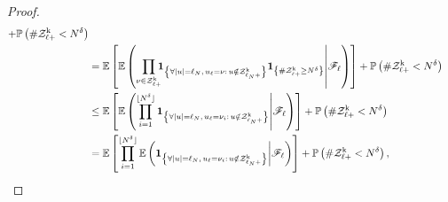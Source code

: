 \begin{proof}
\begin{align*}
        +
        \mathbb P\left(
            \#\mathcal Z^{\mathrm{k}}_{\ell+}
            <
            N^\delta
        \right)
        \\ &
        =
        \mathbb E\left[
            \mathbb E\left(
                \prod_{
                    \nu\in
                    \mathcal Z^{\mathrm{k}}_{\ell+}
                }
                \!\!\!
                {\bf 1}_{
                    \left\{
                        \forall|u|=\ell_N,\,
                        u_\ell=\nu:\,
                        u\notin
                        \mathcal Z^{\mathrm{k}}_{\ell_N+}
                    \right\}
                }
                {\bf 1}_{
                    \left\{
                        \#\mathcal Z^{\mathrm{k}}_{\ell+}
                        \ge
                        N^\delta
                    \right\}
                }
                \middle|
                \mathscr F_\ell
            \right)
        \right]
        +
        \mathbb P\left(
            \#\mathcal Z^{\mathrm{k}}_{\ell+}
            <
            N^\delta
        \right)
        \\ &
        \le
        \mathbb E\left[
            \mathbb E\left(
                \prod_{i=1}^{
                    \lfloor N^\delta\rfloor
                }
                {\bf 1}_{
                    \left\{
                        \forall|u|=\ell_N,\,
                        u_\ell=\nu_i:\,
                        u\notin
                        \mathcal Z^{\mathrm{k}}_{\ell_N+}
                    \right\}
                }
                \middle|
                \mathscr F_\ell
            \right)
        \right]
        +
        \mathbb P\left(
            \#\mathcal Z^{\mathrm{k}}_{\ell+}
            <
            N^\delta
        \right)
        \\ &
        =
        \mathbb E\left[
            \prod_{i=1}^{
                \lfloor N^\delta\rfloor
            }
            \mathbb E\left(
                {\bf 1}_{
                    \left\{
                        \forall|u|=\ell_N,\,
                        u_\ell=\nu_i:\,
                        u\notin
                        \mathcal Z^{\mathrm{k}}_{\ell_N+}
                    \right\}
                }
                \middle|
                \mathscr F_\ell
            \right)
        \right]
        +
        \mathbb P\left(
            \#\mathcal Z^{\mathrm{k}}_{\ell+}
            <
            N^\delta
        \right),
    \end{align*}
\end{proof}
